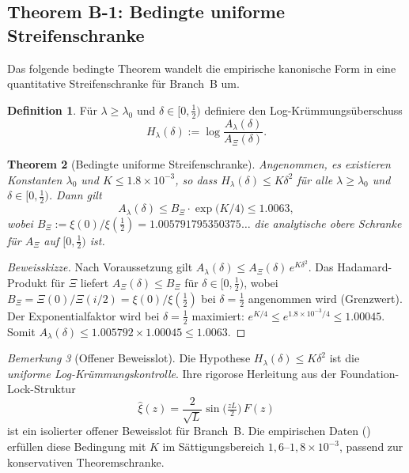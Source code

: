 \documentclass[12pt,a4paper]{article}
\newtheorem{theorem}{Theorem}[section]
\theoremstyle{definition}
\newtheorem{definition}[theorem]{Definition}
\theoremstyle{remark}
\newtheorem{remark}[theorem]{Bemerkung}
\begin{document}
\subsection{Theorem B-1: Bedingte uniforme Streifenschranke}
\label{sec:theorem-b1}

Das folgende bedingte Theorem wandelt die empirische kanonische Form
in eine quantitative Streifenschranke für Branch~B um.

\begin{definition}\label{def:H-lambda}
Für $\lambda \geq \lambda_0$ und $\delta \in [0, \tfrac{1}{2})$
definiere den Log-Krümmungsüberschuss
\[
  H_\lambda(\delta) := \log\frac{A_\lambda(\delta)}{A_\Xi(\delta)}.
\]
\end{definition}

\begin{theorem}[Bedingte uniforme Streifenschranke]
\label{thm:B1}
Angenommen, es existieren Konstanten $\lambda_0$ und
$K \leq 1.8\times 10^{-3}$, so dass
$H_\lambda(\delta) \leq K\delta^2$ für alle
$\lambda \geq \lambda_0$ und $\delta \in [0, \tfrac{1}{2})$. Dann gilt
\begin{equation}\label{eq:B1-bound}
  A_\lambda(\delta)
  \leq B_\Xi \cdot \exp\!\bigl(K/4\bigr)
  \leq 1.0063,
\end{equation}
wobei $B_\Xi := \xi(0)/\xi(\tfrac{1}{2})
= 1.005791795350375\ldots$ die analytische obere Schranke für
$A_\Xi$ auf $[0,\tfrac{1}{2})$ ist.
\end{theorem}

\begin{proof}[Beweisskizze]
Nach Voraussetzung gilt $A_\lambda(\delta) \leq A_\Xi(\delta)\,e^{K\delta^2}$.
Das Hadamard-Produkt für $\Xi$ liefert
$A_\Xi(\delta) \leq B_\Xi$ für $\delta \in [0,\tfrac{1}{2})$, wobei
$B_\Xi = \Xi(0)/\Xi(i/2) = \xi(0)/\xi(\tfrac{1}{2})$ bei
$\delta = \tfrac{1}{2}$ angenommen wird (Grenzwert). Der
Exponentialfaktor wird bei $\delta = \tfrac{1}{2}$ maximiert:
$e^{K/4} \leq e^{1.8\times 10^{-3}/4} \leq 1.00045$.
Somit $A_\lambda(\delta) \leq 1.005792 \times 1.00045 \leq 1.0063$.
\end{proof}

\begin{remark}[Offener Beweisslot]
Die Hypothese $H_\lambda(\delta) \leq K\delta^2$ ist die
\emph{uniforme Log-Krümmungskontrolle}. Ihre rigorose Herleitung aus
der Foundation-Lock-Struktur
\[
  \hat\xi(z) = \frac{2}{\sqrt{L}}\sin\!\bigl(\tfrac{zL}{2}\bigr)\,F(z)
\]
ist ein isolierter offener Beweisslot für Branch~B. Die empirischen Daten
() erfüllen diese Bedingung mit
$K$ im Sättigungsbereich $1{,}6$--$1{,}8\times 10^{-3}$, passend zur
konservativen Theoremschranke.
\end{remark}
\end{document}

